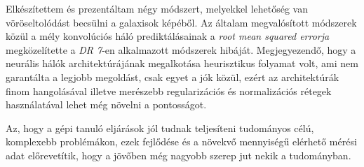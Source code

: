 \documentclass[12pt,letterpaper,oneside,openright]{book}
\begin{document}
Elkészítettem és prezentáltam négy módszert, melyekkel lehetőség van vöröseltolódást becsülni a galaxisok képéből. Az általam megvalósított módszerek közül a mély konvolúciós háló prediktálásainak a \textit{root mean squared errorja} megközelítette a \textit{DR 7}-en alkalmazott módszerek hibáját. Megjegyezendő, hogy a neurális hálók architektúrájának megalkotása heurisztikus folyamat volt, ami nem garantálta a legjobb megoldást, csak egyet a jók közül, ezért az architektúrák finom hangolásával illetve merészebb regularizációs és normalizációs rétegek használatával lehet még növelni a pontosságot. 

Az, hogy a gépi tanuló eljárások jól tudnak teljesíteni tudományos célú, komplexebb problémákon, ezek fejlődése és a növekvő mennyiségű elérhető mérési adat előrevetítik, hogy a jövőben még nagyobb szerep jut nekik a tudományban.
\newpage
\end{document}
